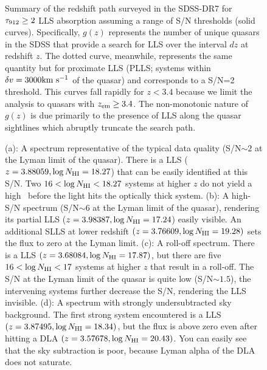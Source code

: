 \documentclass[12pt,preprint]{aastex}
\begin{document}
\begin{figure}
\caption{Summary of the redshift path surveyed in the SDSS-DR7
for $\tau_{\rm 912} \ge 2$ LLS absorption assuming a range of S/N thresholds
(solid curves).  Specifically, $g(z)$ represents the number of 
unique quasars in the SDSS that provide a search for LLS over
the interval $dz$ at redshift $z$.  The dotted curve, meanwhile,
represents the same quantity but for proximate LLS (PLLS; systems
within $\delta v = 3000 {\rm km~s^{-1}}$ of the quasar) and corresponds
to a S/N=2 threshold.  This curves fall rapidly for $z<3.4$
because we limit the analysis to quasars with $z_{\rm em} \ge 3.4$.
The non-monotonic nature of $g(z)$ is due primarily to the presence
of LLS along the quasar sightlines which abruptly truncate the search path.
}
\label{fig:goz}
\end{figure}

\begin{figure}
\caption{
(a): A spectrum representative of the typical data quality 
(S/N$\sim 2$ at the Lyman limit of the quasar). 
There is a LLS ($z=3.88059, \log N_{\rm HI}=18.27$) that can be easily identified 
at this S/N. 
Two $16< \log N_{\rm HI} <18.27$ systems at higher $z$ do not yield a 
high \tll\ before the light hits the optically thick system.
(b): A high-S/N spectrum (S/N$\sim 6$ at the Lyman limit of the quasar), 
rendering its partial LLS ($z=3.98387, \log N_{\rm HI}=17.24$) 
easily visible. An additional SLLS at lower redshift 
$(z=3.76609, \log N_{\rm HI}=19.28)$ sets the flux to zero at the Lyman limit.
(c): A roll-off spectrum. There is a LLS $(z=3.68084, \log N_{\rm HI}=17.87)$, 
but there are five $16 < \log N_{\rm HI} <17$ systems at higher $z$ that result 
in a roll-off. The S/N at the Lyman limit of the quasar is quite low 
(S/N$\sim 1.5$), the intervening systems further decrease 
the S/N, rendering the LLS invisible.
(d): A spectrum with strongly undersubtracted sky background. The 
first strong system encountered is a LLS 
$(z=3.87495, \log N_{\rm HI}=18.34)$, but the flux is above zero even 
after hitting a DLA $(z=3.57678, \log N_{\rm HI}=20.43)$. 
You can easily see that the sky subtraction is poor, because 
Lyman alpha of the DLA does not saturate. 
}
\label{fig:mockex}
\end{figure}
\end{document}
